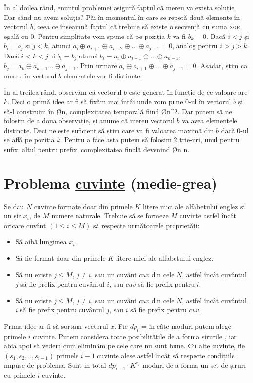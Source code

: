 În al doilea rând, enunțul problemei asigură faptul că mereu va exista soluție. Dar când nu avem soluție? Păi în momentul în care se repetă două elemente în vectorul $b$, ceea ce înseamnă faptul că trebuie să existe o secvență cu suma \textsc{xor} egală cu $0$. Pentru simplitate vom spune că pe poziția $k$ va fi $b_k = 0$. Dacă $i < j$ și $b_i = b_j$ și $j < k$, atunci $a_i \oplus a_{i+1} \oplus a_{i+2} \oplus \dots \oplus a_{j-1} = 0$, analog pentru $i > j > k$. Dacă $i < k < j$ și $b_i = b_j$ atunci $b_i = a_i \oplus a_{i+1} \oplus \dots \oplus a_{k-1}$, $b_j = a_k \oplus a_{k+1} \dots \oplus a_{j-1}$. Prin urmare $a_i \oplus a_{i+1} \oplus \dots \oplus a_{j-1} = 0$. Așadar, știm ca mereu în vectorul $b$ elementele vor fi distincte.

În al treilea rând, observăm că vectorul $b$ este generat în funcție de ce valoare are $k$. Deci o primă idee ar fi să fixăm mai întâi unde vom pune $0$-ul în vectorul $b$ și să-l construim în \O{n}, complexitatea temporală fiind \O{n^2}. Dar putem să ne folosim de a doua observație, și anume că mereu vectorul $b$ va avea elementele distincte. Deci ne este suficient să știm care va fi valoarea maximă din $b$ dacă $0$-ul se află pe poziția $k$. Pentru a face asta putem să folosim 2 trie-uri, unul pentru sufix, altul pentru prefix, complexitatea finală devenind \O{n \log n}.

\section{Problema \href{https://kilonova.ro/problems/65}{cuvinte} (medie-grea)} 
Se dau $N$ cuvinte formate doar din primele $K$ litere mici ale alfabetului englez și un șir $x_i$, de $M$ numere naturale. Trebuie să se formeze $M$ cuvinte astfel încât oricare cuvânt $(1 \leq i \leq M)$ să respecte următoarele proprietăți:
\begin{itemize}
        \item Să aibă lungimea $x_i$.
        \item Să fie format doar din primele $K$ litere mici ale alfabetului englez.
        \item Să nu existe $j \leq M,\, j \neq i$, sau un cuvânt $cuv$ din cele $N$, astfel încât cuvântul $j$ să fie prefix pentru cuvântul $i$, sau $cuv$ să fie prefix pentru $i$.
        \item Să nu existe $j \leq M,\, j \neq i$, sau un cuvânt $cuv$ din cele $N$, astfel încât cuvântul $i$ să fie prefix pentru cuvântul $j$, sau $i$ să fie prefix pentru $cuv$.
\end{itemize}
Prima idee ar fi să sortam vectorul $x$.
Fie $dp_i$ = în câte moduri putem alege primele $i$ cuvinte. Putem considera toate posibilitățile de a forma șirurile , iar abia apoi să vedem cum eliminăm pe cele care nu sunt bune. Cu alte cuvinte, fie $(s_1, s_2, .. , s_{i-1})$ primele $i-1$ cuvinte alese astfel încât să respecte condițiile impuse de problemă. Sunt în total $dp_{i-1} \cdot K^{x_i}$ moduri de a forma un set de șiruri cu primele $i$ cuvinte.

